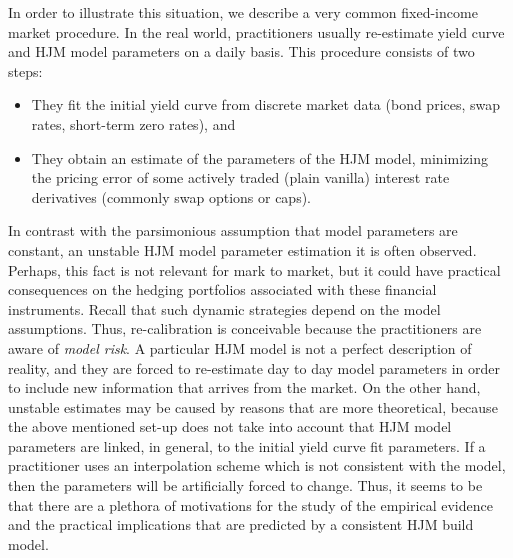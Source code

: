 In order to illustrate this situation, we describe a very common fixed-income market
procedure. In the real world, practitioners usually re-estimate yield
curve and HJM model parameters on a daily basis. This procedure
consists of two steps:  
\begin{itemize}
\item They fit the initial yield curve from discrete market data (bond prices,
  swap rates, short-term zero rates), and
\item They obtain an estimate of the parameters of the HJM model, minimizing
  the pricing error of some actively traded (plain vanilla) interest rate
  derivatives (commonly swap options or caps).
\end{itemize}
In contrast with the parsimonious assumption that model parameters are
constant, an unstable HJM model parameter estimation it is often
observed. Perhaps, this 
fact is not relevant for mark to market, but it could have practical 
consequences on the hedging portfolios associated with these financial
instruments. Recall that  
such dynamic strategies depend on the model assumptions. Thus,
re-calibration is conceivable 
because the practitioners are aware of {\sl model risk}. A particular
HJM model is not a perfect description of reality, and they are forced
to re-estimate day to day model parameters in order to include new
information that arrives from the market.  
On the other hand, unstable estimates may be caused by reasons that
are more theoretical, 
because the above mentioned set-up does not take into account that HJM model
parameters are linked, in general, to the initial yield curve fit
parameters. If a practitioner uses an interpolation scheme which is
not consistent with the model, then the parameters will be
artificially forced to change. 
Thus, it seems to be that there are a plethora of motivations for the
study of the empirical evidence and the practical implications that
are predicted by a consistent HJM build model.  


